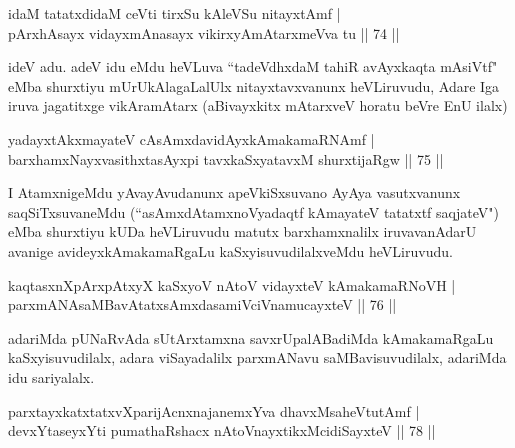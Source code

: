 
\begin{shl}
idaM tatatxdidaM ceVti tirxSu kAleVSu nitayxtAmf |\\
pArxhAsayx vidayxmAnasayx vikirxyAmAtarxmeVva tu \hfill || 74 ||
\end{shl}

\begin{artha}
ideV adu. adeV idu eMdu heVLuva ``tadeVdhxdaM tahiR avAyxkaqta mAsiVtf" eMba shurxtiyu mUrUkAlagaLalUlx nitayxtavxvanunx heVLiruvudu, Adare Iga iruva jagatitxge vikAramAtarx (aBivayxkitx mAtarxveV horatu beVre EnU ilalx)
\end{artha}

\begin{shl}
yadayxtAkxmayateV cAsAmxdavidAyxkAmakamaRNAmf |\\
barxhamxNayxvasithxtasAyxpi tavxkaSxyatavxM shurxtijaRgw \hfill || 75 ||
\end{shl}

\begin{artha}
I AtamxnigeMdu yAvayAvudanunx apeVkiSxsuvano AyAya vasutxvanunx saqSiTxsuvaneMdu (``asAmxdAtamxnoVyadaqtf kAmayateV tatatxtf saqjateV") eMba shurxtiyu kUDa heVLiruvudu matutx barxhamxnalilx iruvavanAdarU avanige avideyxkAmakamaRgaLu kaSxyisuvudilalxveMdu heVLiruvudu.
\end{artha}


\begin{shl}
kaqtasxnXpArxpAtxyX kaSxyoV nAtoV vidayxteV kAmakamaRNoVH |\\
parxmANAsaMBavAtatxsAmxdasamiVciVnamucayxteV \hfill || 76 ||
\end{shl}

\begin{artha}
adariMda pUNaRvAda sUtArxtamxna savxrUpalABadiMda kAmakamaRgaLu kaSxyisuvudilalx, adara viSayadalilx parxmANavu saMBavisuvudilalx, adariMda idu sariyalalx.
\end{artha}


\begin{shl}
parxtayxkatxtatxvXparijAcnxnajanemxYva dhavxMsaheVtutAmf |\\
devxYtaseyxYti pumathaRshacx nAtoV\s nayxtikxMcidiSayxteV \hfill || 78 ||
\end{shl}

